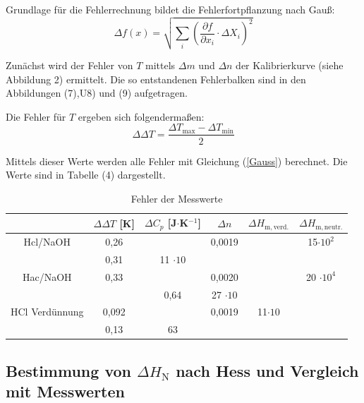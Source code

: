 \documentclass[12pt,a4paper,titlepage,headinclude,bibtotoc]{scrartcl}
\begin{document}
Grundlage für die Fehlerrechnung bildet die Fehlerfortpflanzung nach Gauß:\\

\begin{equation} \label{Gauss}
\Delta f(x) = \sqrt{\sum_i \left(\frac{\partial f}{\partial x_i} \cdot \Delta X_i \right)^2 }
\end{equation}

Zunächst wird der Fehler von $T$ mittels $\Delta m$ und $\Delta n$ der Kalibrierkurve (siehe Abbildung 2) %
 ermittelt. Die so entstandenen Fehlerbalken sind in den Abbildungen (7),U8) und (9) aufgetragen. 



Die Fehler für $T$ ergeben sich folgendermaßen:\\

\begin{equation}
\Delta \Delta T= \frac{\Delta T_\mathrm{max}- \Delta T_\mathrm{min}}{2}
\end{equation}

Mittels dieser Werte werden alle Fehler mit Gleichung (\ref{Gauss}) berechnet. Die Werte sind in Tabelle (4)
dargestellt.\\

\begin{table}\label{TabelleFehler} \caption{Fehler der Messwerte}
\begin{tabular}{c|c|c|c|c|c}

	&$\Delta \Delta T$ [K]&	$\Delta C_p$ [J$\cdot$K$^{-1}$]	&$\Delta n$& $\Delta H_\mathrm{m, verd.}$	&$\Delta H_\mathrm{m,neutr.}$\\
	\hline
	Hcl/NaOH	&0,26	&	&0,0019	&	&15$\cdot 10^2$\\
	& 0,31	&11 $\cdot 10$		&	 & &\\
	\hline
	Hac/NaOH &	0,33&	&	0,0020	&&	20 $\cdot 10^4$\\
	&&0,64&	27 $\cdot 10$& &\\
	\hline
	HCl Verdünnung&	0,092	&&	0,0019&	11$\cdot 10$ &\\
	&0,13&	63& & &\\	 
\end{tabular} 
\end{table}
\FloatBarrier

\subsection{Bestimmung von $\Delta H_\mathrm{N}$ nach Hess und Vergleich mit Messwerten}
\end{document}

